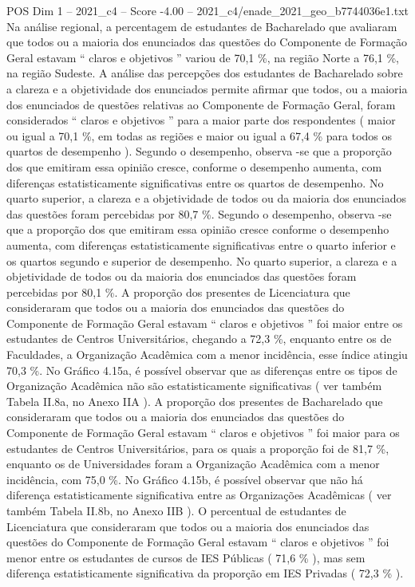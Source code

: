\begin{textsample}{POS Dim 1 – 2021\_c4 – Score -4.00 – 2021\_c4/enade\_2021\_geo\_b7744036e1.txt}
Na análise regional, a percentagem de estudantes de Bacharelado que avaliaram que todos ou a maioria dos enunciados das questões do Componente de Formação Geral estavam “ claros e objetivos ” variou de 70,1 \%, na região Norte a 76,1 \%, na região Sudeste.
A análise das percepções dos estudantes de Bacharelado sobre a clareza e a objetividade dos enunciados permite afirmar que todos, ou a maioria dos enunciados de questões relativas ao Componente de Formação Geral, foram considerados “ claros e objetivos ” para a maior parte dos respondentes ( maior ou igual a 70,1 \%, em todas as regiões e maior ou igual a 67,4 \% para todos os quartos de desempenho ).
Segundo o desempenho, observa -se que a proporção dos que emitiram essa opinião cresce, conforme o desempenho aumenta, com diferenças estatisticamente significativas entre os quartos de desempenho.
No quarto superior, a clareza e a objetividade de todos ou da maioria dos enunciados das questões foram percebidas por 80,7 \%.
Segundo o desempenho, observa -se que a proporção dos que emitiram essa opinião cresce conforme o desempenho aumenta, com diferenças estatisticamente significativas entre o quarto inferior e os quartos segundo e superior de desempenho.
No quarto superior, a clareza e a objetividade de todos ou da maioria dos enunciados das questões foram percebidas por 80,1 \%.
A proporção dos presentes de Licenciatura que consideraram que todos ou a maioria dos enunciados das questões do Componente de Formação Geral estavam “ claros e objetivos ” foi maior entre os estudantes de Centros Universitários, chegando a 72,3 \%, enquanto entre os de Faculdades, a Organização Acadêmica com a menor incidência, esse índice atingiu 70,3 \%.
No Gráfico 4.15a, é possível observar que as diferenças entre os tipos de Organização Acadêmica não são estatisticamente significativas ( ver também Tabela II.8a, no Anexo IIA ).
A proporção dos presentes de Bacharelado que consideraram que todos ou a maioria dos enunciados das questões do Componente de Formação Geral estavam “ claros e objetivos ” foi maior para os estudantes de Centros Universitários, para os quais a proporção foi de 81,7 \%, enquanto os de Universidades foram a Organização Acadêmica com a menor incidência, com 75,0 \%.
No Gráfico 4.15b, é possível observar que não há diferença estatisticamente significativa entre as Organizações Acadêmicas ( ver também Tabela II.8b, no Anexo IIB ).
O percentual de estudantes de Licenciatura que consideraram que todos ou a maioria dos enunciados das questões do Componente de Formação Geral estavam “ claros e objetivos ” foi menor entre os estudantes de cursos de IES Públicas ( 71,6 \% ), mas sem diferença estatisticamente significativa da proporção em IES Privadas ( 72,3 \% ).

\end{textsample}
